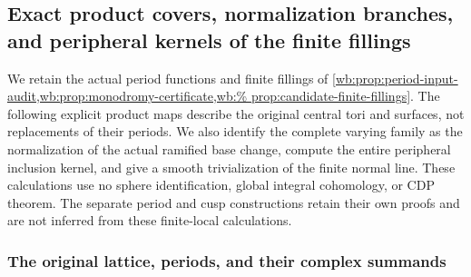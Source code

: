 \subsection{Exact product covers, normalization branches, and peripheral kernels of the finite fillings}
\label{wb:ffcert:sec:finite-fillings}

We retain the actual period functions and finite fillings of
\cref{wb:prop:period-input-audit,wb:prop:monodromy-certificate,wb:%
prop:candidate-finite-fillings}. The following explicit product maps
describe the original central tori and surfaces, not replacements of
their periods. We also identify the complete varying family as the
normalization of the actual ramified base change, compute the entire
peripheral inclusion kernel, and give a smooth trivialization of the
finite normal line. These calculations use no sphere identification,
global integral cohomology, or CDP theorem. The separate period and cusp
constructions retain their own proofs and are not inferred from these
finite-local calculations.

\subsubsection{The original lattice, periods, and their complex summands}

